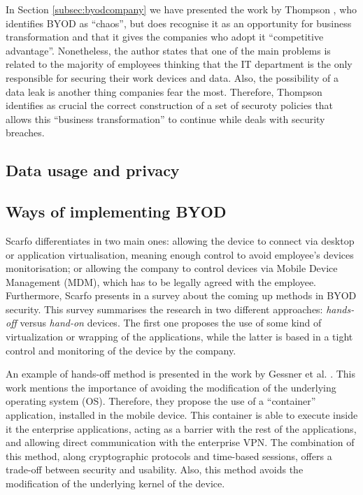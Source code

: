 In Section \ref{subsec:byodcompany} we have presented the work by Thompson \cite{thomson2012byod}, who identifies BYOD as ``chaos'', but does recognise it as an opportunity for business transformation and that it gives the companies who adopt it ``competitive advantage''. Nonetheless, the author states that one of the main problems is related to the majority of employees thinking that the IT department is the only responsible for securing their work devices and data. Also, the possibility of a data leak is another thing companies fear the most. Therefore, Thompson identifies as crucial the correct construction of a set of securoty policies that allows this ``business transformation'' to continue while deals with security breaches.


\subsection{Data usage and privacy}


\subsection{Ways of implementing BYOD}

Scarfo differentiates in \cite{scarfo2012new} two main ones: allowing the device to connect via desktop or application virtualisation, meaning enough control to avoid employee's devices monitorisation; or allowing the company to control devices via Mobile Device Management (MDM), which has to be legally agreed with the employee. Furthermore, Scarfo presents in \cite{Scarfo12survey} a survey about the coming up methods in BYOD security. This survey summarises the research in two different approaches: {\em hands-off} versus {\em hand-on} devices. The first one proposes the use of some kind of virtualization or wrapping of the applications, while the latter is based in a tight control and monitoring of the device by the company.

An example of hands-off method is presented in the work by Gessner et al. \cite{Gessner13userfriendly}. This work mentions the importance of avoiding the modification of the underlying operating system (OS). Therefore, they propose the use of a ``container'' application, installed in the mobile device. This container is able to execute inside it the enterprise applications, acting as a barrier with the rest of the applications, and allowing direct communication with the enterprise VPN. The combination of this method, along cryptographic protocols and time-based sessions, offers a trade-off between security and usability. Also, this method avoids the modification of the underlying kernel of the device.

